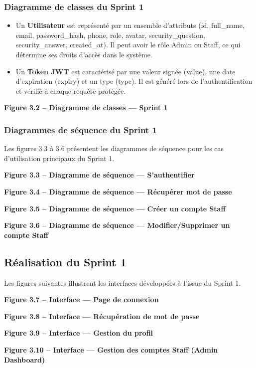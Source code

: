 \subsubsection{Diagramme de classes du Sprint 1}

\begin{itemize}
\item Un \textbf{Utilisateur} est représenté par un ensemble d'attributs (id, full\_name, email, password\_hash, phone, role, avatar, security\_question, security\_answer, created\_at). Il peut avoir le rôle Admin ou Staff, ce qui détermine ses droits d'accès dans le système.
\item Un \textbf{Token JWT} est caractérisé par une valeur signée (value), une date d'expiration (expiry) et un type (type). Il est généré lors de l'authentification et vérifié à chaque requête protégée.
\end{itemize}

\textbf{Figure 3.2 – Diagramme de classes — Sprint 1}

\subsubsection{Diagrammes de séquence du Sprint 1}

Les figures 3.3 à 3.6 présentent les diagrammes de séquence pour les cas d'utilisation principaux du Sprint 1.

\textbf{Figure 3.3 – Diagramme de séquence — S'authentifier}

\textbf{Figure 3.4 – Diagramme de séquence — Récupérer mot de passe}

\textbf{Figure 3.5 – Diagramme de séquence — Créer un compte Staff}

\textbf{Figure 3.6 – Diagramme de séquence — Modifier/Supprimer un compte Staff}

\subsection{Réalisation du Sprint 1}

Les figures suivantes illustrent les interfaces développées à l'issue du Sprint 1.

\textbf{Figure 3.7 – Interface — Page de connexion}

\textbf{Figure 3.8 – Interface — Récupération de mot de passe}

\textbf{Figure 3.9 – Interface — Gestion du profil}

\textbf{Figure 3.10 – Interface — Gestion des comptes Staff (Admin Dashboard)}

